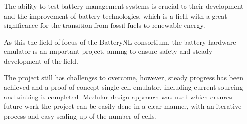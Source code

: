 \IEEEPARstart
{T}{he} ability to test battery management systems is crucial 
to their development and the improvement of battery technologies,
which is a field with a great significance for the transition
from fossil fuels to renewable energy. 

As this the field of focus of the BatteryNL consortium, the
battery hardware emulator is an important project, aiming to 
ensure safety and steady development of the field. 

The project still has challenges to overcome, however, steady progress
has been achieved and a proof of concept single cell emulator, including 
current sourcing and sinking is completed. Modular design approach was used 
which ensures future work the project can be easily done in a clear 
manner, with an iterative process and easy scaling up of the number of cells. 